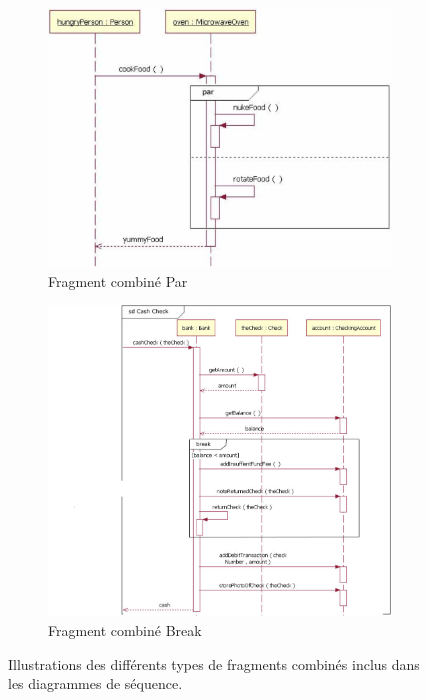 \begin{figure}[H]
\begin{subfigure}{0.45\textwidth}
\includegraphics[width=\textwidth]{./Images/Diagrammes/diagram_sequence_fc_par.png}
\caption{Fragment combiné \og Par\fg}
\label{fig:diagram_sequence_fc_par}
\end{subfigure}
\begin{subfigure}{0.45\textwidth}
\includegraphics[width=\textwidth]{./Images/Diagrammes/diagram_sequence_fc_break.png}
\caption{Fragment combiné \og Break\fg}
\label{fig:diagram_sequence_fc_break}
\end{subfigure}
\caption{Illustrations des différents types de fragments combinés inclus dans les diagrammes de séquence.}
\end{figure}


